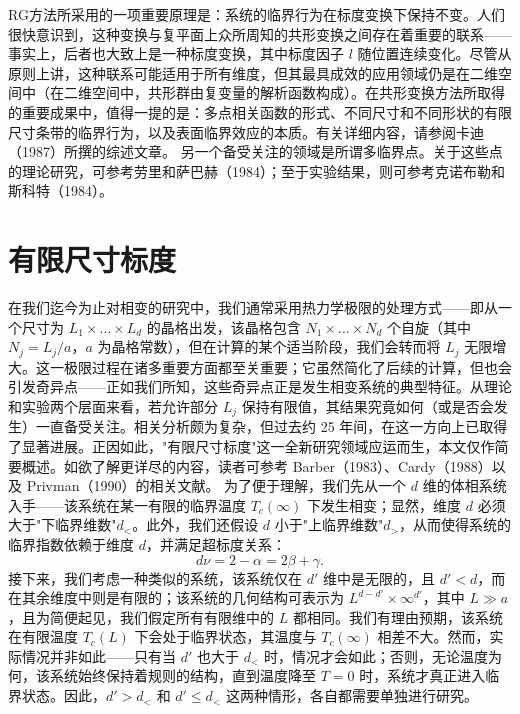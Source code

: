 RG方法所采用的一项重要原理是：系统的临界行为在标度变换下保持不变。人们很快意识到，这种变换与复平面上众所周知的共形变换之间存在着重要的联系——事实上，后者也大致上是一种标度变换，其中标度因子 \(l\) 随位置连续变化。尽管从原则上讲，这种联系可能适用于所有维度，但其最具成效的应用领域仍是在二维空间中（在二维空间中，共形群由复变量的解析函数构成）。在共形变换方法所取得的重要成果中，值得一提的是：多点相关函数的形式、不同尺寸和不同形状的有限尺寸条带的临界行为，以及表面临界效应的本质。有关详细内容，请参阅卡迪（1987）所撰的综述文章。
另一个备受关注的领域是所谓多临界点。关于这些点的理论研究，可参考劳里和萨巴赫（1984）；至于实验结果，则可参考克诺布勒和斯科特（1984）。
\section{有限尺寸标度}\label{ux6709ux9650ux5c3aux5bf8ux6807ux5ea6}
在我们迄今为止对相变的研究中，我们通常采用热力学极限的处理方式——即从一个尺寸为 \(L_1 \times \ldots \times L_d\) 的晶格出发，该晶格包含 \(N_1 \times \ldots \times N_d\) 个自旋（其中 \(N_j = L_j/a\)，\(a\) 为晶格常数），但在计算的某个适当阶段，我们会转而将 \(L_j\) 无限增大。这一极限过程在诸多重要方面都至关重要；它虽然简化了后续的计算，但也会引发奇异点——正如我们所知，这些奇异点正是发生相变系统的典型特征。从理论和实验两个层面来看，若允许部分 \(L_j\) 保持有限值，其结果究竟如何（或是否会发生）一直备受关注。相关分析颇为复杂，但过去约 25 年间，在这一方向上已取得了显著进展。正因如此，"有限尺寸标度"这一全新研究领域应运而生，本文仅作简要概述。如欲了解更详尽的内容，读者可参考 Barber（1983）、Cardy（1988）以及 Privman（1990）的相关文献。
为了便于理解，我们先从一个 \(d\) 维的体相系统入手——该系统在某一有限的临界温度 \(T_{c}(\infty)\) 下发生相变；显然，维度 \(d\) 必须大于"下临界维数"\(d_{<}\)。此外，我们还假设 \(d\) 小于"上临界维数"\(d_{>}\)，从而使得系统的临界指数依赖于维度 \(d\)，并满足超标度关系：
\begin{equation}\tag{14.4.51}\label{eq:14.4.51}
d \nu = 2 - \alpha = 2 \beta + \gamma .
\end{equation}
接下来，我们考虑一种类似的系统，该系统仅在 \(d'\) 维中是无限的，且 \(d' < d\)，而在其余维度中则是有限的；该系统的几何结构可表示为 \(L^{d-d'} \times \infty^{d'}\)，其中 \(L \gg a\)，且为简便起见，我们假定所有有限维中的 \(L\) 都相同。我们有理由预期，该系统在有限温度 \(T_c(L)\) 下会处于临界状态，其温度与 \(T_c(\infty)\) 相差不大。然而，实际情况并非如此——只有当 \(d'\) 也大于 \(d_{<}\) 时，情况才会如此；否则，无论温度为何，该系统始终保持着规则的结构，直到温度降至 \(T = 0\) 时，系统才真正进入临界状态。因此，\(d' > d_{<}\) 和 \(d' \leq d_{<}\) 这两种情形，各自都需要单独进行研究。
